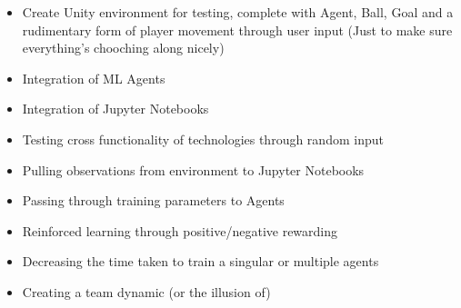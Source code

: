 \begin{itemize}
  \item Create Unity environment for testing, complete with Agent, Ball, Goal and a rudimentary form of player movement through user input (Just to make sure 
everything's chooching along nicely)
  \item Integration of ML Agents 
  \item Integration of Jupyter Notebooks
  \item Testing cross functionality of technologies through random input
  \item Pulling observations from environment to Jupyter Notebooks
  \item Passing through training parameters to Agents
  \item Reinforced learning through positive/negative rewarding
  \item Decreasing the time taken to train a singular or multiple agents
  \item Creating a team dynamic (or the illusion of)
\end{itemize}